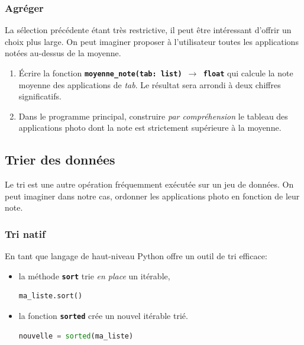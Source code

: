 \documentclass[a4paper,11pt]{article}
\begin{document}
\subsubsection{Agréger}
La sélection précédente étant très restrictive, il peut être intéressant d'offrir un choix plus large. On peut imaginer proposer à l'utilisateur toutes les applications notées au-dessus de la moyenne.
\begin{activite}
    \begin{enumerate}
        \item Écrire la fonction \textbf{\texttt{moyenne\_note(tab: list)  $\rightarrow$ float}} qui calcule la note moyenne des applications de \emph{tab}. Le résultat sera arrondi à deux chiffres significatifs.
        \item Dans le programme principal, construire \emph{par compréhension }le tableau des applications photo dont la note est strictement supérieure à la moyenne.
    \end{enumerate}
\end{activite}
\subsection{Trier des données}
Le tri est une autre opération fréquemment exécutée sur un jeu de données. On peut imaginer dans notre cas, ordonner les applications photo en fonction de leur note. 
\subsubsection{Tri natif}
En tant que langage de haut-niveau Python offre un outil de tri efficace:
\begin{itemize}
    \item la méthode \textbf{\texttt{sort}} trie \emph{en place} un itérable,
    \begin{center}
    \begin{lstlisting}[language=Python]
ma_liste.sort()
    \end{lstlisting}
    \end{center}
    \item la fonction \textbf{\texttt{sorted}} crée un nouvel itérable trié.
    \begin{center}
    \begin{lstlisting}[language=Python]
nouvelle = sorted(ma_liste)   
    \end{lstlisting}
    \end{center}
\end{itemize}
\end{document}
